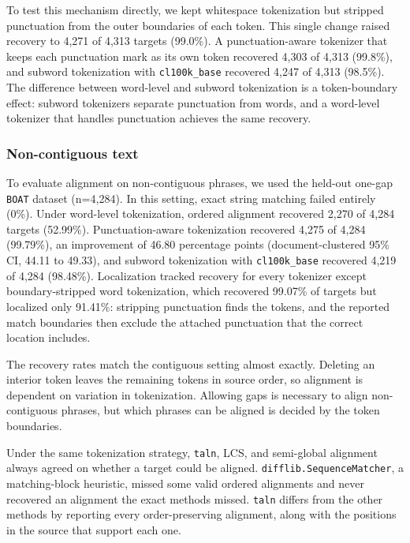 \documentclass[10pt,twocolumn]{article}
\theoremstyle{plain}
\theoremstyle{definition}
\theoremstyle{remark}
\begin{document}
To test this mechanism directly, we kept whitespace tokenization but stripped punctuation from the outer boundaries of each token. This single change raised recovery to 4,271 of 4,313 targets (99.0\%). A punctuation-aware tokenizer that keeps each punctuation mark as its own token recovered 4,303 of 4,313 (99.8\%), and subword tokenization with \texttt{cl100k\_base} recovered 4,247 of 4,313 (98.5\%). The difference between word-level and subword tokenization is a token-boundary effect: subword tokenizers separate punctuation from words, and a word-level tokenizer that handles punctuation achieves the same recovery.

\subsubsection{Non-contiguous text}
To evaluate alignment on non-contiguous phrases, we used the held-out one-gap \texttt{BOAT} dataset (n=4,284). In this setting, exact string matching failed entirely (0\%). Under word-level tokenization, ordered alignment recovered 2,270 of 4,284 targets (52.99\%). Punctuation-aware tokenization recovered 4,275 of 4,284 (99.79\%), an improvement of 46.80 percentage points (document-clustered 95\% CI, 44.11 to 49.33), and subword tokenization with \texttt{cl100k\_base} recovered 4,219 of 4,284 (98.48\%). Localization tracked recovery for every tokenizer except boundary-stripped word tokenization, which recovered 99.07\% of targets but localized only 91.41\%: stripping punctuation finds the tokens, and the reported match boundaries then exclude the attached punctuation that the correct location includes.

The recovery rates match the contiguous setting almost exactly. Deleting an interior token leaves the remaining tokens in source order, so alignment is dependent on variation in tokenization. Allowing gaps is necessary to align non-contiguous phrases, but which phrases can be aligned is decided by the token boundaries.

Under the same tokenization strategy, \texttt{taln}, LCS, and semi-global alignment always agreed on whether a target could be aligned. \texttt{difflib.SequenceMatcher}, a matching-block heuristic, missed some valid ordered alignments and never recovered an alignment the exact methods missed. \texttt{taln} differs from the other methods by reporting every order-preserving alignment, along with the positions in the source that support each one.
\end{document}
